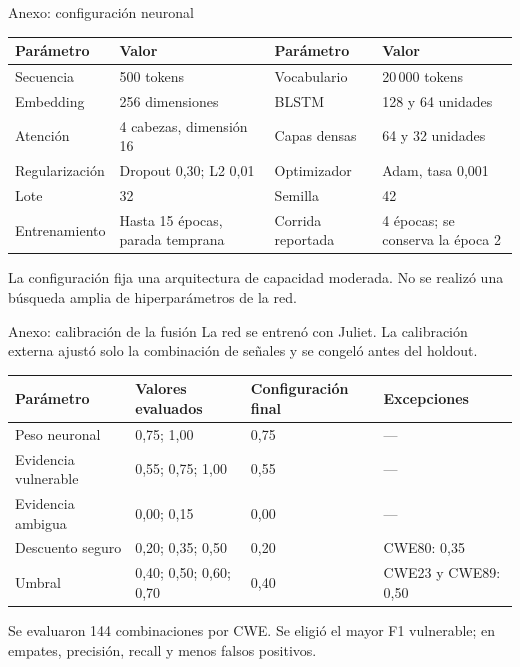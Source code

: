 \begin{frame}{Anexo: configuración neuronal}
\smalltable
\begin{tabularx}{\textwidth}{@{}lXlX@{}}
\toprule
\textbf{Parámetro} & \textbf{Valor} & \textbf{Parámetro} & \textbf{Valor}\\\midrule
Secuencia & 500 tokens & Vocabulario & 20\,000 tokens\\[1mm]
Embedding & 256 dimensiones & BLSTM & 128 y 64 unidades\\[1mm]
Atención & 4 cabezas, dimensión 16 & Capas densas & 64 y 32 unidades\\[1mm]
Regularización & Dropout 0,30; L2 0,01 & Optimizador & Adam, tasa 0,001\\[1mm]
Lote & 32 & Semilla & 42\\[1mm]
Entrenamiento & Hasta 15 épocas, parada temprana & Corrida reportada & 4 épocas; se conserva la época 2\\\bottomrule
\end{tabularx}
\par\vspace{5mm}\small
La configuración fija una arquitectura de capacidad moderada. No se realizó una búsqueda amplia de hiperparámetros de la red.
\end{frame}

\begin{frame}{Anexo: calibración de la fusión}
\small
La red se entrenó con Juliet. La calibración externa ajustó solo la combinación de señales y se congeló antes del holdout.
\par\vspace{4mm}
\smalltable
\begin{tabularx}{\textwidth}{@{}lXlX@{}}
\toprule
\textbf{Parámetro} & \textbf{Valores evaluados} & \textbf{Configuración final} & \textbf{Excepciones}\\\midrule
Peso neuronal & 0,75; 1,00 & 0,75 & ---\\[1mm]
Evidencia vulnerable & 0,55; 0,75; 1,00 & 0,55 & ---\\[1mm]
Evidencia ambigua & 0,00; 0,15 & 0,00 & ---\\[1mm]
Descuento seguro & 0,20; 0,35; 0,50 & 0,20 & CWE80: 0,35\\[1mm]
Umbral & 0,40; 0,50; 0,60; 0,70 & 0,40 & CWE23 y CWE89: 0,50\\\bottomrule
\end{tabularx}
\par\vspace{4mm}\small
Se evaluaron 144 combinaciones por CWE. Se eligió el mayor F1 vulnerable; en empates, precisión, recall y menos falsos positivos.
\end{frame}

